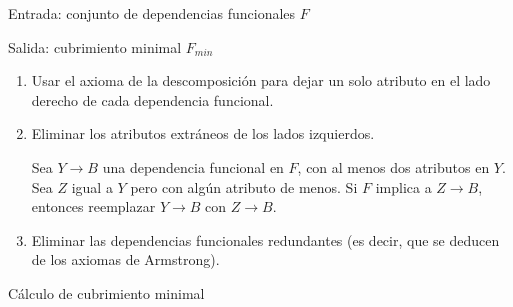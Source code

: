 \documentclass[a4paper, twoside]{article}
\begin{document}
\begin{algorithm}[H]
	Entrada: conjunto de dependencias funcionales $F$

	Salida: cubrimiento minimal $F_{min}$
	\begin{enumerate}
		\item Usar el axioma de la descomposición para dejar un solo atributo en el lado derecho de cada dependencia funcional.

		\item Eliminar los atributos extráneos de los lados izquierdos.

		Sea $Y\to B$ una dependencia funcional en $F$, con al menos dos atributos en $Y$. Sea $Z$ igual a $Y$ pero con algún atributo de menos. Si $F$ implica a $Z\to B$, entonces reemplazar $Y\to B$ con $Z\to B$.

		\item Eliminar las dependencias funcionales redundantes (es decir, que se deducen de los axiomas de Armstrong).
	\end{enumerate}
	\caption{Cálculo de cubrimiento minimal}
\end{algorithm}
\end{document}
